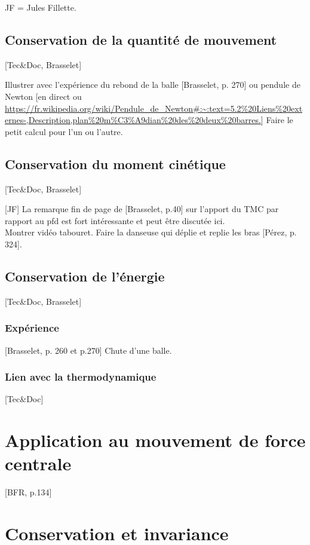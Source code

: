 \documentclass[11pt]{report}
\numberwithin{figure}{section}
\numberwithin{equation}{section}
\numberwithin{table}{section}
\newcommand{\1}{\boldsymbol{1}}
\begin{document}
JF = Jules Fillette.

\subsection{Conservation de la quantité de mouvement}

[Tec\&Doc, Brasselet]

Illustrer avec l'expérience du rebond de la balle [Brasselet, p. 270] ou pendule de Newton [en direct ou \url{https://fr.wikipedia.org/wiki/Pendule_de_Newton#:~:text=5.2%20Liens%20externes-,Description,plan%20m%C3%A9dian%20des%20deux%20barres.}] 
Faire le petit calcul pour l'un ou l'autre.

\subsection{Conservation du moment cinétique}

[Tec\&Doc, Brasselet]

[JF] La remarque fin de page de [Brasselet, p.40] sur l’apport du TMC par rapport au pfd est fort intéressante et peut être discutée ici. \\

Montrer vidéo tabouret. Faire la danseuse qui déplie et replie les bras [Pérez, p. 324].


\subsection{Conservation de l'énergie}

[Tec\&Doc, Brasselet]

\subsubsection{Expérience} [Brasselet, p. 260 et p.270] Chute d'une balle.

\subsubsection{Lien avec la thermodynamique} 

[Tec\&Doc]

\section{Application au mouvement de force centrale}

[BFR, p.134]

\section{Conservation et invariance}
\end{document}
